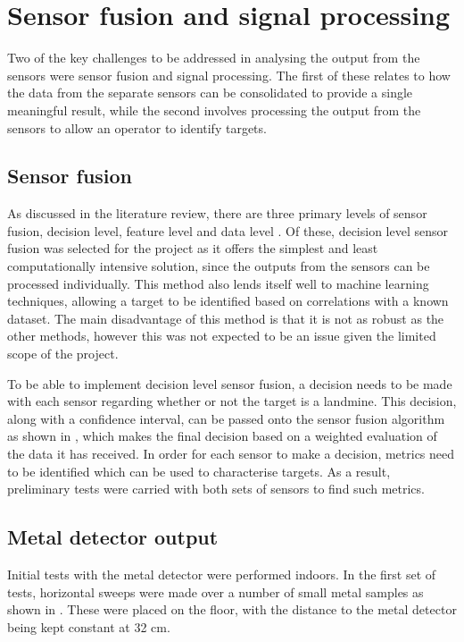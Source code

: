\documentclass[main.tex]{subfiles}
\begin{document}
\section{Sensor fusion and signal processing}
Two of the key challenges to be addressed in analysing the output from the sensors were sensor fusion and signal processing. The first of these relates to how the data from the separate sensors can be consolidated to provide a single meaningful result, while the second involves processing the output from the sensors to allow an operator to identify targets. 

\subsection{Sensor fusion}
As discussed in the literature review, there are three primary levels of sensor fusion, decision level, feature level and data level \parencite{Yarovoy2009}. Of these, decision level sensor fusion was selected for the project as it offers the simplest and least computationally intensive solution, since the outputs from the sensors can be processed individually. This method also lends itself well to machine learning techniques, allowing a target to be identified based on correlations with a known dataset. The main disadvantage of this method is that it is not as robust as the other methods, however this was not expected to be an issue given the limited scope of the project. 

To be able to implement decision level sensor fusion, a decision needs to be made with each sensor regarding whether or not the target is a landmine. This decision, along with a confidence interval, can be passed onto the sensor fusion algorithm as shown in , which makes the final decision based on a weighted evaluation of the data it has received. In order for each sensor to make a decision, metrics need to be identified which can be used to characterise targets. As a result, preliminary tests were carried with both sets of sensors to find such metrics.

\subsection{Metal detector output}
Initial tests with the metal detector were performed indoors. In the first set of tests, horizontal sweeps were made over a number of small metal samples as shown in . These were placed on the floor, with the distance to the metal detector being kept constant at 32 cm. 
\end{document}
